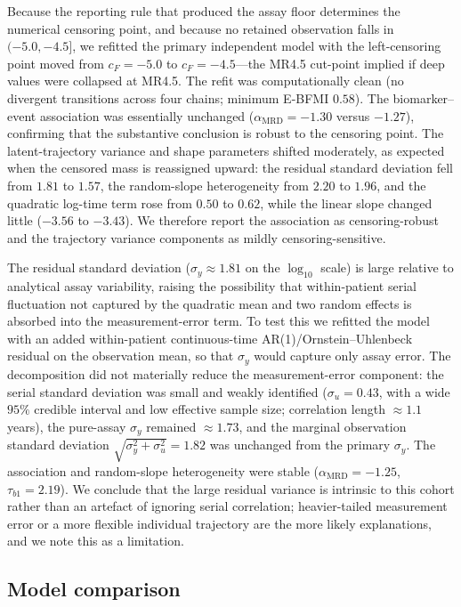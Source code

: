 \documentclass[11pt]{article}
\begin{document}
Because the reporting rule that produced the assay floor determines the numerical
censoring point, and because no retained observation falls in $(-5.0,-4.5]$, we
refitted the primary independent model with the left-censoring point moved from
$c_F=-5.0$ to $c_F=-4.5$---the MR4.5 cut-point implied if deep values were collapsed
at MR4.5. The refit was computationally clean (no divergent transitions across four
chains; minimum E-BFMI $0.58$). The biomarker--event association was essentially
unchanged ($\alpha_{\mathrm{MRD}}=-1.30$ versus $-1.27$), confirming that the
substantive conclusion is robust to the censoring point. The latent-trajectory
variance and shape parameters shifted moderately, as expected when the censored
mass is reassigned upward: the residual standard deviation fell from $1.81$ to
$1.57$, the random-slope heterogeneity from $2.20$ to $1.96$, and the quadratic
log-time term rose from $0.50$ to $0.62$, while the linear slope changed little
($-3.56$ to $-3.43$). We therefore report the association as censoring-robust and
the trajectory variance components as mildly censoring-sensitive.

The residual standard deviation ($\sigma_y\approx1.81$ on the $\log_{10}$ scale) is
large relative to analytical assay variability, raising the possibility that
within-patient serial fluctuation not captured by the quadratic mean and two random
effects is absorbed into the measurement-error term. To test this we refitted the
model with an added within-patient continuous-time AR(1)/Ornstein--Uhlenbeck
residual on the observation mean, so that $\sigma_y$ would capture only assay error.
The decomposition did not materially reduce the measurement-error component: the
serial standard deviation was small and weakly identified ($\sigma_u=0.43$, with a
wide $95\%$ credible interval and low effective sample size; correlation length
$\approx1.1$ years), the pure-assay $\sigma_y$ remained $\approx1.73$, and the
marginal observation standard deviation $\sqrt{\sigma_y^2+\sigma_u^2}=1.82$ was
unchanged from the primary $\sigma_y$. The association and random-slope
heterogeneity were stable ($\alpha_{\mathrm{MRD}}=-1.25$, $\tau_{b1}=2.19$). We
conclude that the large residual variance is intrinsic to this cohort rather than an
artefact of ignoring serial correlation; heavier-tailed measurement error or a more
flexible individual trajectory are the more likely explanations, and we note this as
a limitation.

\subsection{Model comparison}
\end{document}
